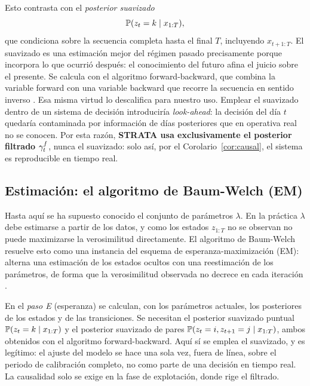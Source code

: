 Esto contrasta con el \emph{posterior suavizado}
\[
\mathbb{P}(z_t = k \mid x_{1:T}),
\]
que condiciona sobre la secuencia completa hasta el final $T$, incluyendo $x_{t+1:T}$. El suavizado es una estimación mejor del régimen pasado precisamente porque incorpora lo que ocurrió después: el conocimiento del futuro afina el juicio sobre el presente. Se calcula con el algoritmo forward-backward, que combina la variable forward con una variable backward que recorre la secuencia en sentido inverso \cite{baum1970, rabiner1989}. Esa misma virtud lo descalifica para nuestro uso. Emplear el suavizado dentro de un sistema de decisión introduciría \emph{look-ahead}: la decisión del día $t$ quedaría contaminada por información de días posteriores que en operativa real no se conocen. Por esta razón, \textbf{STRATA usa exclusivamente el posterior filtrado $\gamma^{f}_t$}, nunca el suavizado: solo así, por el Corolario~\ref{cor:causal}, el sistema es reproducible en tiempo real.

\subsection{Estimación: el algoritmo de Baum-Welch (EM)}
\label{sec:hmm-em}

Hasta aquí se ha supuesto conocido el conjunto de parámetros $\lambda$. En la práctica $\lambda$ debe estimarse a partir de los datos, y como los estados $z_{1:T}$ no se observan no puede maximizarse la verosimilitud directamente. El algoritmo de Baum-Welch resuelve esto como una instancia del esquema de esperanza-maximización (EM): alterna una estimación de los estados ocultos con una reestimación de los parámetros, de forma que la verosimilitud observada no decrece en cada iteración \cite{baum1970, dempster1977}.

En el \emph{paso E} (esperanza) se calculan, con los parámetros actuales, los posteriores de los estados y de las transiciones. Se necesitan el posterior suavizado puntual $\mathbb{P}(z_t = k \mid x_{1:T})$ y el posterior suavizado de pares $\mathbb{P}(z_t = i, z_{t+1} = j \mid x_{1:T})$, ambos obtenidos con el algoritmo forward-backward. Aquí sí se emplea el suavizado, y es legítimo: el ajuste del modelo se hace una sola vez, fuera de línea, sobre el periodo de calibración completo, no como parte de una decisión en tiempo real. La causalidad solo se exige en la fase de explotación, donde rige el filtrado.


